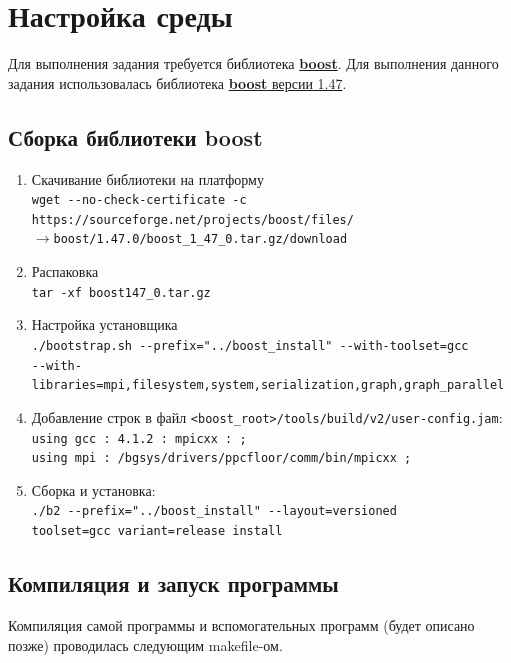 \documentclass[12pt, a4paper]{article}
\begin{document}
    \section{Настройка среды}
        Для выполнения задания требуется библиотека \href{http://www.boost.org/}{\textbf{boost}}. Для выполнения данного задания использовалась библиотека \href{http://www.boost.org/users/history/version_1_47_0.html}{\textbf{boost} версии 1.47}.

        \subsection{Сборка библиотеки boost}
        \begin{enumerate}
            \item Скачивание библиотеки на платформу\\
                \verb|wget --no-check-certificate -c|\\
                \verb|https://sourceforge.net/projects/boost/files/|\\
                $\rightarrow$\verb|boost/1.47.0/boost_1_47_0.tar.gz/download|
            \item Распаковка\\
                \verb|tar -xf boost147_0.tar.gz|
            \item Настройка установщика\\
                \verb|./bootstrap.sh --prefix="../boost_install" --with-toolset=gcc|\\
                \verb|--with-libraries=mpi,filesystem,system,serialization,graph,graph_parallel|
            \item Добавление строк в файл \verb|<boost_root>/tools/build/v2/user-config.jam|:\\
                \verb|using gcc : 4.1.2 : mpicxx : ;|\\
                \verb|using mpi : /bgsys/drivers/ppcfloor/comm/bin/mpicxx ;|
            \item Сборка и установка:\\
                \verb|./b2 --prefix="../boost_install" --layout=versioned|\\
                \verb|toolset=gcc variant=release install|
        \end{enumerate}

        \subsection{Компиляция и запуск программы}\label{sec:compile}
            Компиляция самой программы и вспомогательных программ (будет описано позже) проводилась следующим makefile-ом.
            \inputminted[breaklines=true,fontsize=\scriptsize,frame=single]{make}{makefile}
\end{document}
